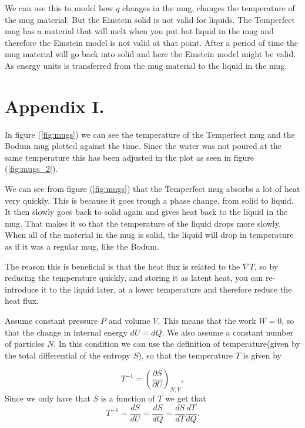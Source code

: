 \documentclass[reprint,english,notitlepage]{revtex4-1}  %
\begin{document}
We can use this to model how $q$ changes in the mug, changes the temperature of the mug material. But the Einstein solid is not valid for liquids. The Temperfect mug has a material that will melt when you put hot liquid in the mug and therefore the Einstein model is not valid at that point. After a period of time the mug material will go back into solid and here the Einstein model might be valid. As energy units is transferred from the mug material to the liquid in the mug. 



\newpage
\appendix
\section*{Appendix I.}

In figure (\ref{fig:mugs}) we can see the temperature of the Temperfect mug and the Bodum mug plotted against the time. Since the water was not poured at the same temperature this has been adjusted in the plot as seen in figure (\ref{fig:mugs_2}). 

We can see from figure (\ref{fig:mugs}) that the Temperfect mug absorbs a lot of heat very quickly. This is because it goes trough a phase change, from solid to liquid. It then slowly goes back to solid again and gives heat back to the liquid in the mug. That makes it so that the temperature of the liquid drops more slowly. When all of the material in the mug is solid, the liquid will drop in temperature as if it was a regular mug, like the Bodum. 

The reason this is beneficial is that the heat flux is related to the $\nabla T$, so by reducing the temperature quickly, and storing it as latent heat, you can re-introduce it to the liquid later, at a lower temperature and therefore reduce the heat flux.






Assume constant pressure $P$ and volume $V$. This means that the work $W=0$, so that the change in internal energy $dU=dQ$. We also assume a constant number of particles $N$. In this condition we can use the definition of temperature(given by the total differential of the entropy $S$), so that the temperature $T$ is given by

$$T^{-1}=(\frac{\partial S}{\partial U})_{N,V},$$
Since we only have that $S$ is a function of $T$ we get that 
$$
T^{-1}=\frac{d S}{d U}= \frac{dS}{dQ} =\frac{d S}{dT}\frac{d T}{d Q}.
$$
\end{document}
